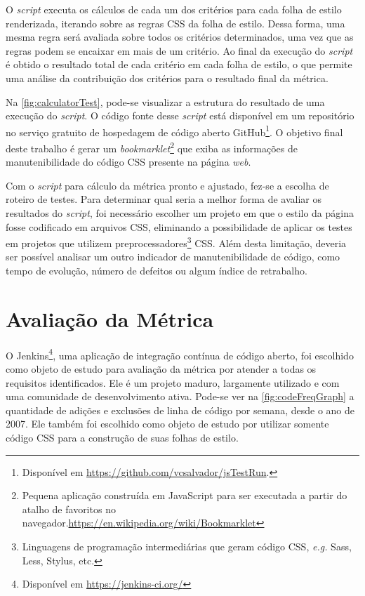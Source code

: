 O \textit{script} executa os cálculos de cada um dos critérios para cada folha de estilo renderizada, iterando sobre as regras CSS da folha de estilo. Dessa forma, uma mesma regra será avaliada sobre todos os critérios determinados, uma vez que as regras podem se encaixar em mais de um critério. Ao final da execução do \textit{script} é obtido o resultado total de cada critério em cada folha de estilo, o que permite uma análise da contribuição dos critérios para o resultado final da métrica.

Na \autoref{fig:calculatorTest}, pode-se visualizar a estrutura do resultado de uma execução do \textit{script}. O código fonte desse \textit{script} está disponível em um repositório no serviço gratuito de hospedagem de código aberto GitHub\footnote{Disponível em \url{https://github.com/vcsalvador/jsTestRun}.}. O objetivo final deste trabalho é gerar um \textit{bookmarklet}\footnote{Pequena aplicação construída em JavaScript para ser executada a partir do atalho de favoritos no navegador.\url{https://en.wikipedia.org/wiki/Bookmarklet}} que exiba as informações de manutenibilidade do código CSS presente na página \textit{web}.

Com o \textit{script} para cálculo da métrica pronto e ajustado, fez-se a escolha de roteiro de testes. Para determinar qual seria a melhor forma de avaliar os resultados do \textit{script}, foi necessário escolher um projeto em que o estilo da página fosse codificado em arquivos CSS, eliminando a possibilidade de aplicar os testes em projetos que utilizem preprocessadores\footnote{Linguagens de programação intermediárias que geram código CSS, \textit{e.g.} Sass, Less, Stylus, etc.} CSS. Além desta limitação, deveria ser possível analisar um outro indicador de manutenibilidade de código, como tempo de evolução, número de defeitos ou algum índice de retrabalho.

\chapter{Avaliação da Métrica}

O Jenkins\footnote{Disponível em \url{https://jenkins-ci.org/}}, uma aplicação de integração contínua de código aberto, foi escolhido como objeto de estudo para avaliação da métrica por atender a todas os requisitos identificados. Ele é um projeto maduro, largamente utilizado e com uma comunidade de desenvolvimento ativa. Pode-se ver na \autoref{fig:codeFreqGraph} a quantidade de adições e exclusões de linha de código por semana, desde o ano de 2007. Ele também foi escolhido como objeto de estudo por utilizar somente código CSS para a construção de suas folhas de estilo.

